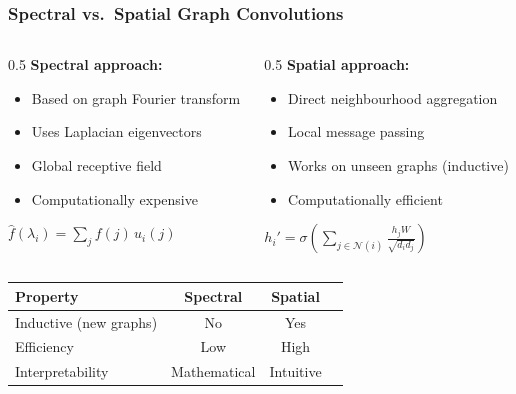 \begin{frame}[fragile]\frametitle{Spectral vs.\ Spatial Graph Convolutions}

\begin{columns}
\begin{column}{0.5\textwidth}
\textbf{Spectral approach:}
\begin{itemize}
\item Based on graph Fourier transform
\item Uses Laplacian eigenvectors
\item Global receptive field
\item Computationally expensive
\end{itemize}
$\hat{f}(\lambda_i) = \sum_{j} f(j)\, u_i(j)$
\end{column}
\begin{column}{0.5\textwidth}
\textbf{Spatial approach:}
\begin{itemize}
\item Direct neighbourhood aggregation
\item Local message passing
\item Works on unseen graphs (inductive)
\item Computationally efficient
\end{itemize}
$h_i' = \sigma\!\left(\sum_{j \in \mathcal{N}(i)} \frac{h_j W}{\sqrt{d_i d_j}}\right)$
\end{column}
\end{columns}

\vspace{0.3cm}

\begin{center}
\begin{tabular}{lccc}
\hline
\textbf{Property} & \textbf{Spectral} & \textbf{Spatial} \\
\hline
Inductive (new graphs) & No & Yes \\
Efficiency & Low & High \\
Interpretability & Mathematical & Intuitive \\
\hline
\end{tabular}
\end{center}

\end{frame}
